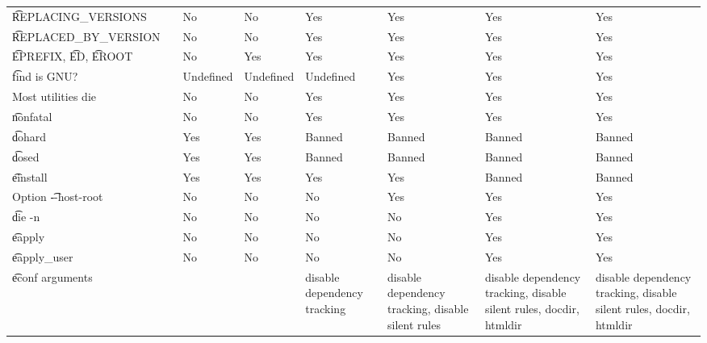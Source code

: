 \begin{landscape}
\begin{longtable}{llP{7.5em}P{7.5em}P{7.5em}P{7.5em}P{7.5em}P{7.5em}}
\t{REPLACING_VERSIONS} &  &
    No & No & Yes & Yes & Yes & Yes \\

\t{REPLACED_BY_VERSION} &  &
    No & No & Yes & Yes & Yes & Yes \\

\t{EPREFIX}, \t{ED}, \t{EROOT} &  &
    No & Yes & Yes & Yes & Yes & Yes \\

\t{find} is GNU? &  &
    Undefined & Undefined & Undefined & Yes & Yes & Yes \\

Most utilities die &  &
    No & No & Yes & Yes & Yes & Yes \\

\t{nonfatal} &  &
    No & No & Yes & Yes & Yes & Yes \\

\t{dohard} &  &
    Yes & Yes & Banned & Banned & Banned & Banned \\

\t{dosed} &  &
    Yes & Yes & Banned & Banned & Banned & Banned \\

\t{einstall} &  &
    Yes & Yes & Yes & Yes & Banned & Banned \\

Option \t{-{}-host-root} &  &
    No & No & No & Yes & Yes & Yes \\

\t{die -n} &  &
    No & No & No & No & Yes & Yes \\

\t{eapply} &  &
    No & No & No & No & Yes & Yes \\

\t{eapply_user} &  &
    No & No & No & No & Yes & Yes \\

\t{econf} arguments &  &
    &  & disable dependency tracking &
    disable dependency tracking, disable silent rules &
    disable dependency tracking, disable silent rules, docdir, htmldir &
    disable dependency tracking, disable silent rules, docdir, htmldir \\


\end{longtable}
\end{landscape}
